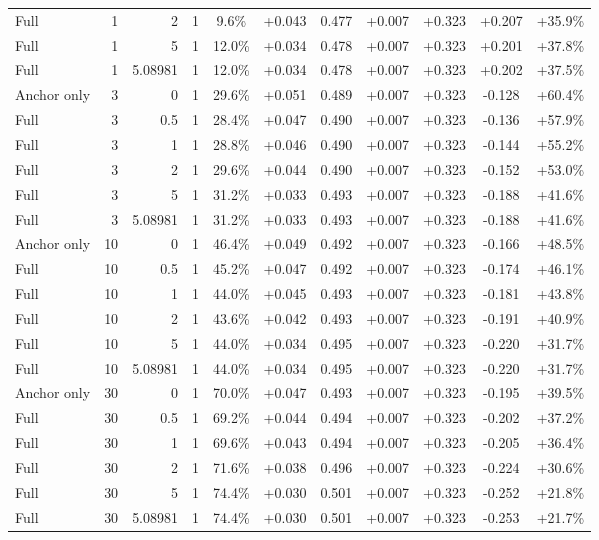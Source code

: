 \begin{table}[htbp]
\begin{tabular}{lrrrccccccc}
Full & 1 & 2 & 1 & 9.6\% & +0.043 & 0.477 & +0.007 & +0.323 & +0.207 & +35.9\% \\
Full & 1 & 5 & 1 & 12.0\% & +0.034 & 0.478 & +0.007 & +0.323 & +0.201 & +37.8\% \\
Full & 1 & 5.08981 & 1 & 12.0\% & +0.034 & 0.478 & +0.007 & +0.323 & +0.202 & +37.5\% \\
Anchor only & 3 & 0 & 1 & 29.6\% & +0.051 & 0.489 & +0.007 & +0.323 & -0.128 & +60.4\% \\
Full & 3 & 0.5 & 1 & 28.4\% & +0.047 & 0.490 & +0.007 & +0.323 & -0.136 & +57.9\% \\
Full & 3 & 1 & 1 & 28.8\% & +0.046 & 0.490 & +0.007 & +0.323 & -0.144 & +55.2\% \\
Full & 3 & 2 & 1 & 29.6\% & +0.044 & 0.490 & +0.007 & +0.323 & -0.152 & +53.0\% \\
Full & 3 & 5 & 1 & 31.2\% & +0.033 & 0.493 & +0.007 & +0.323 & -0.188 & +41.6\% \\
Full & 3 & 5.08981 & 1 & 31.2\% & +0.033 & 0.493 & +0.007 & +0.323 & -0.188 & +41.6\% \\
Anchor only & 10 & 0 & 1 & 46.4\% & +0.049 & 0.492 & +0.007 & +0.323 & -0.166 & +48.5\% \\
Full & 10 & 0.5 & 1 & 45.2\% & +0.047 & 0.492 & +0.007 & +0.323 & -0.174 & +46.1\% \\
Full & 10 & 1 & 1 & 44.0\% & +0.045 & 0.493 & +0.007 & +0.323 & -0.181 & +43.8\% \\
Full & 10 & 2 & 1 & 43.6\% & +0.042 & 0.493 & +0.007 & +0.323 & -0.191 & +40.9\% \\
Full & 10 & 5 & 1 & 44.0\% & +0.034 & 0.495 & +0.007 & +0.323 & -0.220 & +31.7\% \\
Full & 10 & 5.08981 & 1 & 44.0\% & +0.034 & 0.495 & +0.007 & +0.323 & -0.220 & +31.7\% \\
Anchor only & 30 & 0 & 1 & 70.0\% & +0.047 & 0.493 & +0.007 & +0.323 & -0.195 & +39.5\% \\
Full & 30 & 0.5 & 1 & 69.2\% & +0.044 & 0.494 & +0.007 & +0.323 & -0.202 & +37.2\% \\
Full & 30 & 1 & 1 & 69.6\% & +0.043 & 0.494 & +0.007 & +0.323 & -0.205 & +36.4\% \\
Full & 30 & 2 & 1 & 71.6\% & +0.038 & 0.496 & +0.007 & +0.323 & -0.224 & +30.6\% \\
Full & 30 & 5 & 1 & 74.4\% & +0.030 & 0.501 & +0.007 & +0.323 & -0.252 & +21.8\% \\
Full & 30 & 5.08981 & 1 & 74.4\% & +0.030 & 0.501 & +0.007 & +0.323 & -0.253 & +21.7\% \\

\end{tabular}
\end{table}
